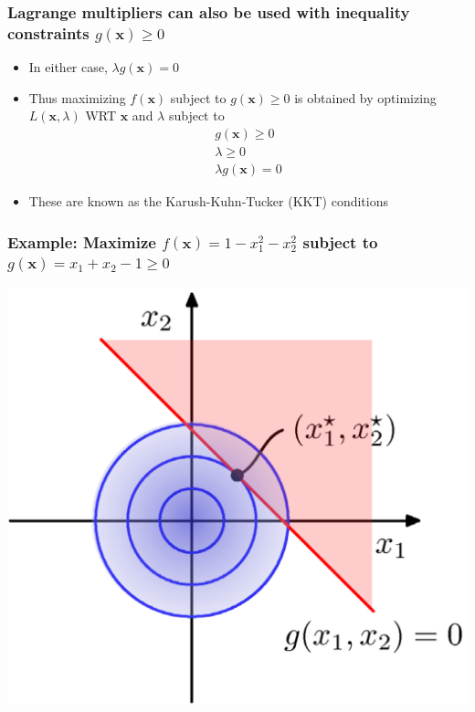 \documentclass[12pt,notes,mathserif]{beamer}
\begin{document}
\begin{frame}[c]
\frametitle{Lagrange multipliers can also be used with inequality constraints $g(\bm{x})\geqslant{}0$}
\begin{itemize}
\item In either case, $\lambda g(\bm{x})=0$
\item Thus maximizing $f(\bm{x})$ subject to $g(\bm{x})\geqslant{}0$ is obtained by optimizing $L(\bm{x},\lambda)$ WRT $\bm{x}$ and $\lambda$ subject to
\[
\begin{array}{c}
g(\bm{x})\geqslant{}0\\
\lambda\geqslant{}0\\
\lambda g(\bm{x})=0
\end{array}
\]
\item These are known as the Karush-Kuhn-Tucker (KKT) conditions
\end{itemize}
\end{frame}


\begin{frame}[c]
\frametitle{Example: Maximize $f(\bm{x})=1-x_1^2-x_2^2$ subject to $g(\bm{x})=x_1+x_2-1\geqslant{}0$}
\begin{center}
\includegraphics[width=0.65\linewidth]{fig8/lec835.jpg}
\end{center}
\end{frame}
\end{document}
